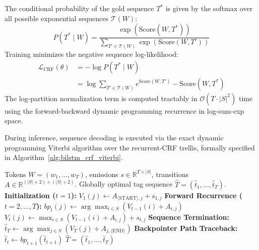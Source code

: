 \documentclass[conference]{IEEEtran}
\begin{document}
The conditional probability of the gold sequence $T^*$ is given by the softmax over all possible exponential sequences $\mathcal{T}(W)$:
\begin{equation}
P(T^* \mid W) = \frac{\exp(\text{Score}(W, T^*))}{\sum_{T' \in \mathcal{T}(W)} \exp(\text{Score}(W, T'))}
\end{equation}
Training minimizes the negative sequence log-likelihood:
\begin{equation}
\begin{aligned}
\mathcal{L}_{\text{CRF}}(\theta) &= -\log P(T^* \mid W) \\
&= \log \sum_{T' \in \mathcal{T}(W)} e^{\text{Score}(W, T')} - \text{Score}(W, T^*)
\end{aligned}
\end{equation}
The log-partition normalization term is computed tractably in $\mathcal{O}(T \cdot |S|^2)$ time using the forward-backward dynamic programming recurrence in log-sum-exp space.

During inference, sequence decoding is executed via the exact dynamic programming Viterbi algorithm over the recurrent-CRF trellis, formally specified in Algorithm~\ref{alg:bilstm_crf_viterbi}.

\begin{algorithm}[!t]
\caption{Hybrid BiLSTM-CRF Viterbi Sequence Decoding}
\label{alg:bilstm_crf_viterbi}
\begin{algorithmic}[1]
\REQUIRE Tokens $W=(w_1, \dots, w_T)$, emissions $s \in \mathbb{R}^{T \times |S|}$, transitions $A \in \mathbb{R}^{(|S|+2) \times (|S|+2)}$.
\ENSURE Globally optimal tag sequence $\hat{T} = (\hat{t}_1, \dots, \hat{t}_T)$.
\STATE \textbf{Initialization ($t = 1$):}
    \STATE $V_1(j) \leftarrow A_{\langle\text{START}\rangle, j} + s_{1, j}$
\ENDFOR
\STATE \textbf{Forward Recurrence ($t = 2, \dots, T$):}
        \STATE $bp_t(j) \leftarrow \arg\max_{i \in S} \left( V_{t-1}(i) + A_{i, j} \right)$
        \STATE $V_t(j) \leftarrow \max_{i \in S} \left( V_{t-1}(i) + A_{i, j} \right) + s_{t, j}$
    \ENDFOR
\ENDFOR
\STATE \textbf{Sequence Termination:}
\STATE $\hat{t}_T \leftarrow \arg\max_{j \in S} \left( V_T(j) + A_{j, \langle\text{END}\rangle} \right)$
\STATE \textbf{Backpointer Path Traceback:}
    \STATE $\hat{t}_t \leftarrow bp_{t+1}(\hat{t}_{t+1})$
\ENDFOR
\RETURN $\hat{T} = (\hat{t}_1, \dots, \hat{t}_T)$
\end{algorithmic}
\end{algorithm}
\end{document}
